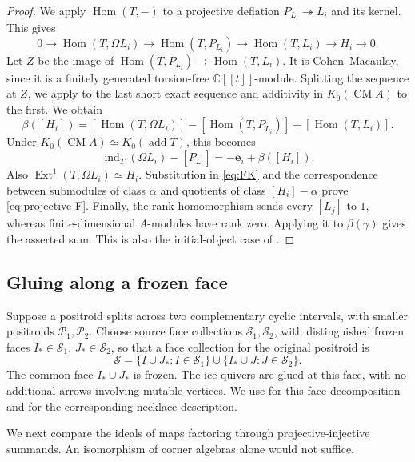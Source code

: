 \documentclass[11pt]{amsart}
\numberwithin{equation}{section}
\theoremstyle{definition}
\theoremstyle{remark}
\newcommand{\op}[1]{\operatorname{#1}}
\newcommand{\Pcal}{\mathcal P}
\newcommand{\add}{\op{add}}
\newcommand{\Hom}{\op{Hom}}
\newcommand{\Ext}{\op{Ext}}
\newcommand{\CM}{\op{CM}}
\newcommand{\ind}{\op{ind}}
\begin{document}
\begin{proof}
We apply $\Hom(T,-)$ to a projective deflation
$P_{L_i}\twoheadrightarrow L_i$ and its kernel. This gives
\[ 0\to\Hom(T,\Omega L_i)\to\Hom(T,P_{L_i}) \to\Hom(T,L_i)\to H_i\to0. \]
Let $Z$ be the image of $\Hom(T,P_{L_i})\to\Hom(T,L_i)$.
It is Cohen--Macaulay, since it is a finitely generated torsion-free
$\mathbb C[[t]]$-module. Splitting the sequence at $Z$, we apply
\cite[Lemma~5.2]{JKS24} to the last short exact sequence and additivity in
$K_0(\CM A)$ to the first. We obtain
\[ \beta([H_i])=[\Hom(T,\Omega L_i)]-[\Hom(T,P_{L_i})]+[\Hom(T,L_i)]. \]
Under $K_0(\CM A)\simeq K_0(\add T)$, this becomes
\[ \ind_T(\Omega L_i)-[P_{L_i}]=-\mathbf e_i+\beta([H_i]). \]
Also $\Ext^1(T,\Omega L_i)\simeq H_i$. Substitution in \eqref{eq:FK}
and the correspondence between submodules of class $\alpha$ and quotients
of class $[H_i]-\alpha$ prove \eqref{eq:projective-F}.
Finally, the rank homomorphism sends every $[L_j]$ to $1$, whereas
finite-dimensional $A$-modules have rank zero. Applying it to
$\beta(\gamma)$ gives the asserted sum. This is also the initial-object
case of \cite[equations~(6.9) and (6.11)]{JKS24}.
\end{proof}

\subsection{Gluing along a frozen face}
Suppose a positroid splits across two complementary cyclic intervals,
with smaller positroids $\Pcal_1,\Pcal_2$. Choose source face collections
$\mathcal S_1,\mathcal S_2$, with distinguished frozen faces
$I_*\in\mathcal S_1$, $J_*\in\mathcal S_2$, so that a face collection
for the original positroid is
\begin{equation}\label{eq:faces} \mathcal S= \{I\cup J_*:I\in\mathcal S_1\} \cup\{I_*\cup J:J\in\mathcal S_2\}.\end{equation}
The common face $I_*\cup J_*$ is frozen. The ice quivers are glued at
this face, with no additional arrows involving mutable vertices.
We use \cite[Propositions~4.1 and 4.6]{Pre} for this face decomposition
and \cite[Section~6.4]{JRS26} for the corresponding necklace description.

We next compare the ideals of maps factoring through projective-injective
summands. An isomorphism of corner algebras alone would not suffice.
\end{document}
